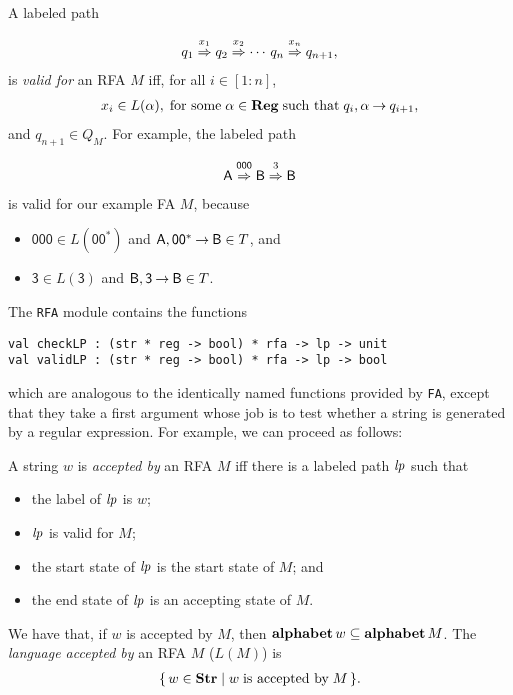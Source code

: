 %
A labeled path
\begin{gather*}
q_1\stackrel{\strut x_1}{\Rightarrow}q_2\stackrel{\strut x_2}{\Rightarrow}\cdots\,q_n\stackrel{\strut x_n}{\Rightarrow}q_{n+1} ,
\end{gather*}
is \emph{valid for} an RFA $M$ iff, for all $i\in[1:n]$,
\begin{gather*}
x_i\in L(\alpha),\;\allowbreak\mbox{for some}\allowbreak\;\alpha\in\mathbf{Reg}\;\allowbreak\mbox{such that}\allowbreak\;
q_i,\alpha\mathbin{\to} q_{i+1} ,
\end{gather*}
and $q_{n+1}\in Q_M$.
For example, the labeled path
\begin{gather*}
\mathsf{A}\stackrel{\strut\mathsf{000}}{\Rightarrow}\mathsf{B}\stackrel{\strut3}{\Rightarrow}\mathsf{B}
\end{gather*}
is valid for our example FA $M$, because
\begin{itemize}
\item $\mathsf{000}\in L(\mathsf{00^*})$ and
  $\mathsf{A},\mathsf{00^*}\mathbin{\to}\mathsf{B}\in T$, and

\item $\mathsf{3}\in L(\mathsf{3})$ and $\mathsf{B},\mathsf{3}\mathbin{\to}\mathsf{B}\in
  T$.
\end{itemize}

The \texttt{RFA} module contains the functions
\begin{verbatim}
val checkLP : (str * reg -> bool) * rfa -> lp -> unit
val validLP : (str * reg -> bool) * rfa -> lp -> bool
\end{verbatim}
%
%
which are analogous to the identically named functions provided by
\texttt{FA}, except that they take a first argument whose job is
to test whether a string is generated by a regular expression.
For example, we can proceed as follows:


%
A string $w$ is \emph{accepted by} an RFA $M$ iff
there is a labeled path ${\it lp}$ such that
\begin{itemize}
\item the label of ${\it lp}$ is $w$;

\item ${\it lp}$ is valid for $M$;

\item the start state of ${\it lp}$ is the start state of $M$; and

\item the end state of ${\it lp}$ is an accepting state of $M$.
\end{itemize}
We have that, if $w$ is accepted by $M$, then
$\mathbf{alphabet}\,w\subseteq\mathbf{alphabet}\,M$.
%
%
%
The \emph{language accepted by} an RFA $M$ ($L(M)$) is
\begin{gather*}
\{ \, w\in\mathbf{Str} \mid w\;\allowbreak\mbox{is accepted by}\allowbreak\;M \, \}.
\end{gather*}

